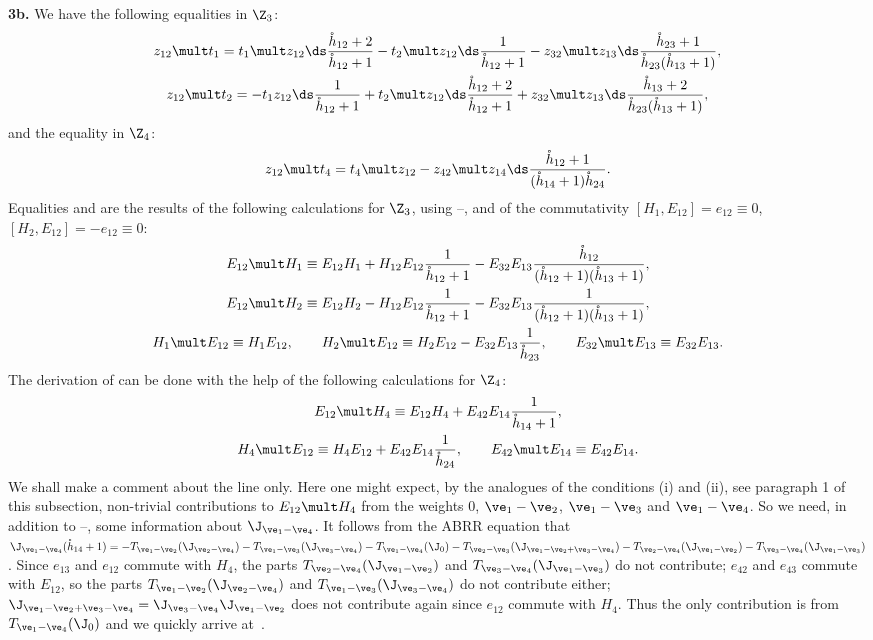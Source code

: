 \documentclass[pdftex]{sigma}
\def\nplus{\mathfrak{n}}\def\nn{\nonumber}\def\nin{\noindent}
\def\s{z}\def\S{\mathrm {S}}\def\si{\sigma}\def\Sp{\S^{\nplus}}\def\sy{\acute{\sigma}}\def\th{\mathring{h}}
\numberwithin{equation}{section}
\begin{document}
{\bf 3b.} We have the following equalities in $\Z_3$:
\begin{gather}\label{proof15}
\s_{12}\mult t_1=t_1\mult\s_{12}  {\ds\frac{\th_{12}+2}{\th_{12}+1}}-t_2\mult\s_{12}  {\ds\frac{1}{\th_{12}+1}}
-\s_{32}\mult\s_{13}  {\ds\frac{\th_{23}+1}{\th_{23}(\th_{13}+1)}}  ,\\
\label{proof16}
\s_{12}\mult t_2=-t_1\s_{12}  {\ds\frac{1}{\th_{12}+1}}+t_2\mult\s_{12}
 {\ds\frac{\th_{12}+2}{\th_{12}+1}}+\s_{32}\mult\s_{13}  {\ds\frac{\th_{13}+2}{\th_{23}(\th_{13}+1)}}  ,
\end{gather}
and the equality in $\Z_4$:
\begin{gather}\label{proof17}
\s_{12}\mult t_4=t_4\mult\s_{12}-\s_{42}\mult\s_{14}  {\ds\frac{\th_{12}+1}{(\th_{14}+1)\th_{24}}}  .
\end{gather}
Equalities  and  are the results of the following calculations for $\Z_3$,
using --, and of the commutativity $[H_1,E_{12}]=e_{12}\equiv 0$,
$[H_2,E_{12}]=-e_{12}\equiv 0$:
\begin{gather*}E_{12}\mult H_1 \equiv E_{12}H_1+H_{12}E_{12}  \frac{1}{\th_{12}+1}-
E_{32}E_{13}  \frac{\th_{12}}{(\th_{12}+1)(\th_{13}+1)}  , \\
 E_{12}\mult H_2 \equiv E_{12}H_2-H_{12}E_{12}  \frac{1}{\th_{12}+1}-
E_{32}E_{13}  \frac{1}{(\th_{12}+1)(\th_{13}+1)}, \\
 H_1\mult E_{12} \equiv H_1E_{12}  , \qquad
 H_2\mult E_{12} \equiv H_2E_{12}-E_{32}E_{13}  \frac{1}{\th_{23}} , \qquad
 E_{32}\mult E_{13} \equiv E_{32}E_{13}  .\end{gather*}
The derivation of  can be done with the help of the following calculations for $\Z_4$:
\begin{gather}\label{pr14n}
E_{12}\mult H_4 \equiv E_{12}H_4+E_{42}E_{14}  \frac{1}{\th_{14}+1},\\
 H_4\mult E_{12} \equiv H_4E_{12}+E_{42}E_{14}  \frac{1}{\th_{24}}  ,\qquad
 E_{42}\mult E_{14} \equiv E_{42}E_{14}  .\nonumber
 \end{gather}
We shall make a comment about the line  only. Here one might expect, by  the analogues of the conditions (i) and (ii), see paragraph 1 of this subsection,
non-trivial contributions to $E_{12}\mult H_4$ from the weights 0, $\ve_1-\ve_2$, $\ve_1-\ve_3$ and $\ve_1-\ve_4$.
So we need, in addition to --, some information about
$\J_{\ve_1-\ve_4}$. It follows from the ABRR equation that $\J_{\ve_1-\ve_4}(\th_{14}+1)=-T_{\ve_1-\ve_2}(\J_{\ve_2-\ve_4})
-T_{\ve_1-\ve_3}(\J_{\ve_3-\ve_4})-T_{\ve_1-\ve_4}(\J_0)-T_{\ve_2-\ve_3}(\J_{\ve_1-\ve_2+\ve_3-\ve_4})-
T_{\ve_2-\ve_4}(\J_{\ve_1-\ve_2})-T_{\ve_3-\ve_4}(\J_{\ve_1-\ve_3})$. Since $e_{13}$ and $e_{12}$
commute with $H_4$, the parts $T_{\ve_2-\ve_4}(\J_{\ve_1-\ve_2})$ and $T_{\ve_3-\ve_4}(\J_{\ve_1-\ve_3})$
do not contribute; $e_{42}$ and $e_{43}$ commute with $E_{12}$, so the parts  $T_{\ve_1-\ve_2}(\J_{\ve_2-\ve_4})$
and $T_{\ve_1-\ve_3}(\J_{\ve_3-\ve_4})$ do not contribute either; $\J_{\ve_1-\ve_2+\ve_3-\ve_4}=
\J_{\ve_3-\ve_4}\J_{\ve_1-\ve_2}$ does not contribute again since $e_{12}$ commute with $H_4$.
Thus the only contribution is from $T_{\ve_1-\ve_4}(\J_0)$ and we quickly arrive at~.
\end{document}
